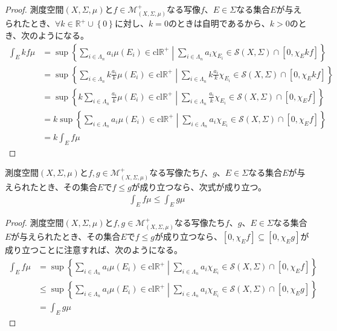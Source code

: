 \documentclass[dvipdfmx]{jsarticle}
\begin{document}
\begin{proof}
測度空間$(X,\varSigma,\mu)$と$f \in \mathcal{M}_{(X,\varSigma,\mu)}^{+}$なる写像$f$、$E \in \varSigma$なる集合$E$が与えられたとき、$\forall k \in \mathbb{R}^{+} \cup \left\{ 0 \right\}$に対し、$k = 0$のときは自明であるから、$k > 0$のとき、次のようになる。
\begin{align*}
\int_{E} {kf\mu} &= \sup\left\{ \sum_{i \in \varLambda_{n}} {a_{i}\mu\left( E_{i} \right)} \in \mathrm{cl}\mathbb{R}^{+} \middle| \sum_{i \in \varLambda_{n}} {a_{i}\chi_{E_{i}}}\in \mathcal{S}(X,\varSigma) \cap \left[ 0,\chi_{E}kf \right] \right\}\\
&= \sup\left\{ \sum_{i \in \varLambda_{n}} {k\frac{a_{i}}{k}\mu\left( E_{i} \right)} \in \mathrm{cl}\mathbb{R}^{+} \middle| \sum_{i \in \varLambda_{n}} {k\frac{a_{i}}{k}\chi_{E_{i}}}\in \mathcal{S}(X,\varSigma) \cap \left[ 0,\chi_{E}kf \right] \right\}\\
&= \sup\left\{ k\sum_{i \in \varLambda_{n}} {\frac{a_{i}}{k}\mu\left( E_{i} \right)} \in \mathrm{cl}\mathbb{R}^{+} \middle| \sum_{i \in \varLambda_{n}} {\frac{a_{i}}{k}\chi_{E_{i}}}\in \mathcal{S}(X,\varSigma) \cap \left[ 0,\chi_{E}f \right] \right\}\\
&= k\sup\left\{ \sum_{i \in \varLambda_{n}} {a_{i}\mu\left( E_{i} \right)} \in \mathrm{cl}\mathbb{R}^{+} \middle| \sum_{i \in \varLambda_{n}} {a_{i}\chi_{E_{i}}}\in \mathcal{S}(X,\varSigma) \cap \left[ 0,\chi_{E}f \right] \right\}\\
&= k\int_{E} {f\mu}
\end{align*}
\end{proof}
\begin{thm}\label{4.6.1.11}
測度空間$(X,\varSigma,\mu)$と$f,g \in \mathcal{M}_{(X,\varSigma,\mu)}^{+}$なる写像たち$f$、$g$、$E \in \varSigma$なる集合$E$が与えられたとき、その集合$E$で$f \leq g$が成り立つなら、次式が成り立つ。
\begin{align*}
\int_{E} {f\mu} \leq \int_{E} {g\mu}
\end{align*}
\end{thm}
\begin{proof}
測度空間$(X,\varSigma,\mu)$と$f,g \in \mathcal{M}_{(X,\varSigma,\mu)}^{+}$なる写像たち$f$、$g$、$E \in \varSigma$なる集合$E$が与えられたとき、その集合$E$で$f \leq g$が成り立つなら、$\left[ 0,\chi_{E}f \right] \subseteq \left[ 0,\chi_{E}g \right]$が成り立つことに注意すれば、次のようになる。
\begin{align*}
\int_{E} {f\mu} &= \sup\left\{ \sum_{i \in \varLambda_{n}} {a_{i}\mu\left( E_{i} \right)} \in \mathrm{cl}\mathbb{R}^{+} \middle| \sum_{i \in \varLambda_{n}} {a_{i}\chi_{E_{i}}}\in \mathcal{S}(X,\varSigma) \cap \left[ 0,\chi_{E}f \right] \right\}\\
&\leq \sup\left\{ \sum_{i \in \varLambda_{n}} {a_{i}\mu\left( E_{i} \right)} \in \mathrm{cl}\mathbb{R}^{+} \middle| \sum_{i \in \varLambda_{n}} {a_{i}\chi_{E_{i}}}\in \mathcal{S}(X,\varSigma) \cap \left[ 0,\chi_{E}g \right] \right\}\\
&= \int_{E} {g\mu}
\end{align*}
\end{proof}
\end{document}
